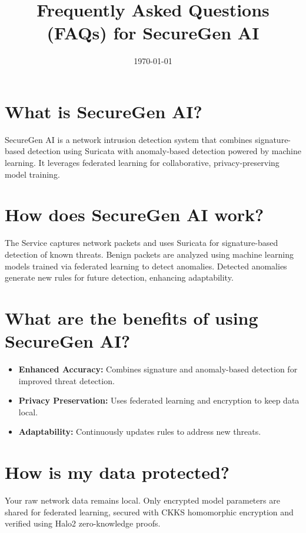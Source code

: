 \documentclass[12pt]{article}
\begin{document}
\title{Frequently Asked Questions (FAQs) for SecureGen AI}
\author{}
\date{\today}
\maketitle

\section*{What is SecureGen AI?}
SecureGen AI is a network intrusion detection system that combines signature-based detection using Suricata with anomaly-based detection powered by machine learning. It leverages federated learning for collaborative, privacy-preserving model training.

\section*{How does SecureGen AI work?}
The Service captures network packets and uses Suricata for signature-based detection of known threats. Benign packets are analyzed using machine learning models trained via federated learning to detect anomalies. Detected anomalies generate new rules for future detection, enhancing adaptability.

\section*{What are the benefits of using SecureGen AI?}
\begin{itemize}
    \item \textbf{Enhanced Accuracy:} Combines signature and anomaly-based detection for improved threat detection.
    \item \textbf{Privacy Preservation:} Uses federated learning and encryption to keep data local.
    \item \textbf{Adaptability:} Continuously updates rules to address new threats.
\end{itemize}

\section*{How is my data protected?}
Your raw network data remains local. Only encrypted model parameters are shared for federated learning, secured with CKKS homomorphic encryption and verified using Halo2 zero-knowledge proofs.
\end{document}
